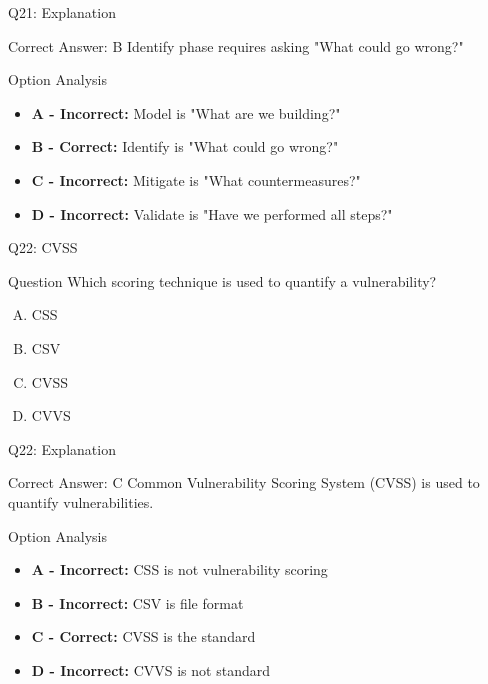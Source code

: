 \documentclass{beamer}
\begin{document}
	\begin{frame}{Q21: Explanation}
		\begin{block}{Correct Answer: B}
			Identify phase requires asking "What could go wrong?"
		\end{block}
		\begin{block}{Option Analysis}
			\begin{itemize}
				\item \textbf{A - Incorrect:} Model is "What are we building?"
				\item \textbf{B - Correct:} Identify is "What could go wrong?"
				\item \textbf{C - Incorrect:} Mitigate is "What countermeasures?"
				\item \textbf{D - Incorrect:} Validate is "Have we performed all steps?"
			\end{itemize}
		\end{block}
	\end{frame}
	
	\begin{frame}{Q22: CVSS}
		\begin{block}{Question}
			Which scoring technique is used to quantify a vulnerability?
		\end{block}
		\begin{enumerate}[(A)]
			\item CSS
			\item CSV
			\item CVSS
			\item CVVS
		\end{enumerate}
	\end{frame}
	
	\begin{frame}{Q22: Explanation}
		\begin{block}{Correct Answer: C}
			Common Vulnerability Scoring System (CVSS) is used to quantify vulnerabilities.
		\end{block}
		\begin{block}{Option Analysis}
			\begin{itemize}
				\item \textbf{A - Incorrect:} CSS is not vulnerability scoring
				\item \textbf{B - Incorrect:} CSV is file format
				\item \textbf{C - Correct:} CVSS is the standard
				\item \textbf{D - Incorrect:} CVVS is not standard
			\end{itemize}
		\end{block}
	\end{frame}
	
\end{document}
